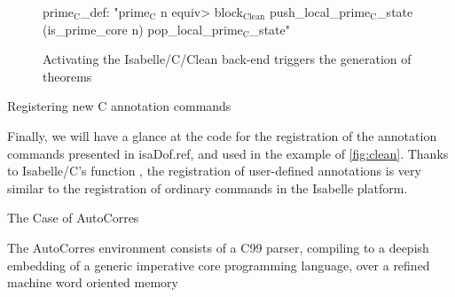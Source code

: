 \begin{isabellebody}
\begin{isamarkuptext}
\begin{figure}
\begin{minipage}{0.45\linewidth}
\begin{isar}
prime$_{\text{C}}$_def: "prime$_{\text{C}}$ n \<equiv>
  block$_{\text{Clean}}$ push_local_prime$_{\text{C}}$_state
             (is_prime_core n)
             pop_local_prime$_{\text{C}}$_state"
\end{isar}
  \end{minipage}
  \caption{Activating the Isabelle/C/Clean back-end triggers the generation of theorems}
  \label{fig:clean}
\end{figure}%
\end{isamarkuptext}\isamarkuptrue%
%
\begin{isamarkupfigure*}%
[label = {C-sample10},type = {Isa_COL.figure}, args={label = {C-sample10},type = {Isa_COL.figure}, Isa_COL.figure.relative_width = {40}, Isa_COL.figure.src = {figures/A-C-Source10}, Isa_COL.figure.spawn_columns = {True}}]Registering new C annotation commands%
\end{isamarkupfigure*}\isamarkuptrue%
%
\begin{isamarkuptext}%
Finally, we will have a glance at the code for the registration of the annotation commands presented
in \csname isaDof.ref, and used in the example of \autoref{fig:clean}. Thanks to
Isabelle/C's function , the registration of
user-defined annotations is very similar to the registration of ordinary commands in the Isabelle
platform.%
\end{isamarkuptext}\isamarkuptrue%
%
\begin{isamarkupsubsection*}%
[label = {autocorres},type = {scholarly_paper.technical}, args={label = {autocorres},type = {scholarly_paper.technical}, scholarly_paper.text_section.main_author = {@{docitem ''fred''}}, Isa_COL.text_element.level = {}, Isa_COL.text_element.referentiable = {False}, Isa_COL.text_element.variants = {{STR ''outline'', STR ''document''}}, scholarly_paper.text_section.fixme_list = {}, Isa_COL.text_element.level = {}, scholarly_paper.technical.definition_list = {}}]The Case of AutoCorres%
\end{isamarkupsubsection*}\isamarkuptrue%
%
\begin{isamarkuptext}%
The AutoCorres environment consists of a C99 parser, compiling to a deepish embedding
of a generic imperative core programming language, over a refined machine word oriented memory

\end{isamarkuptext}
\end{isabellebody}

